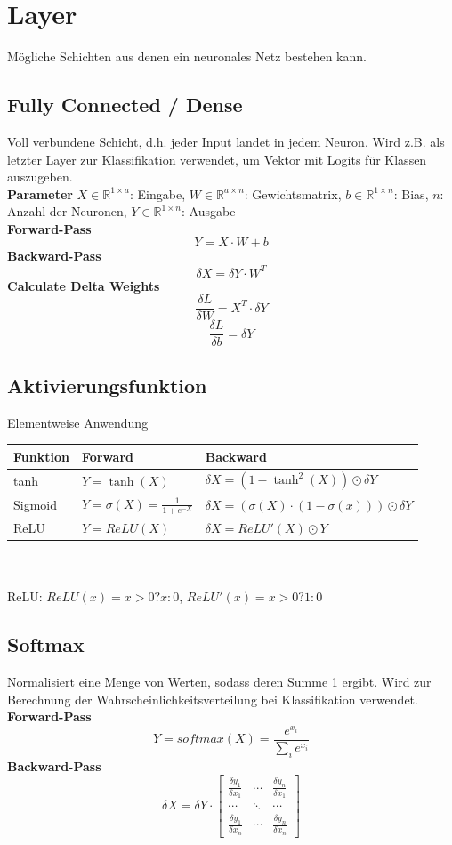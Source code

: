 \documentclass[12pt]{article}
\newcommand{\R}{\mathbb{R}}
\begin{document}
	\section{Layer}
	Mögliche Schichten aus denen ein neuronales Netz bestehen kann.
	\subsection{Fully Connected / Dense}
	Voll verbundene Schicht, d.h. jeder Input landet in jedem Neuron. Wird z.B. als letzter Layer zur Klassifikation verwendet, um Vektor mit Logits für Klassen auszugeben.\\
	\textbf{Parameter} $X \in \R^{1 \times a}$: Eingabe, $W \in \R^{a \times n}$: Gewichtsmatrix, $b \in \R^{1 \times n}$: Bias, $n$: Anzahl der Neuronen, $Y \in \R^{1 \times n}$: Ausgabe\\
	\textbf{Forward-Pass} $$Y = X \cdot W + b$$
	\textbf{Backward-Pass} $$\delta X = \delta Y \cdot W^T$$
	\textbf{Calculate Delta Weights} $$\frac{\delta L}{\delta W} = X^T \cdot \delta Y$$ $$\frac{\delta L}{\delta b} = \delta Y$$
	\subsection{Aktivierungsfunktion}
	Elementweise Anwendung\\
	\begin{tabular}{|l|l|l|}
	\hline
	\textbf{Funktion} & \textbf{Forward} & \textbf{Backward}\\
	\hline
	tanh & $Y = \tanh(X)$ & $\delta X = (1 - \tanh^2(X)) \odot \delta Y$\\
	\hline
	Sigmoid & $Y = \sigma(X) = \frac{1}{1 + e^{-X}}$ & $\delta X = (\sigma(X) \cdot (1-\sigma(x))) \odot \delta Y$\\
	\hline
	ReLU & $Y = ReLU(X)$ & $\delta X = ReLU'(X) \odot Y$\\
	\hline
	\end{tabular}\\
	\\
	ReLU: $ReLU(x) = x > 0 ? x : 0$, $ReLU'(x) = x > 0 ? 1 : 0$
	\subsection{Softmax}
	Normalisiert eine Menge von Werten, sodass deren Summe 1 ergibt. Wird zur Berechnung der Wahrscheinlichkeitsverteilung bei Klassifikation verwendet.\\
	\textbf{Forward-Pass} $$Y = softmax(X) = \frac{e^{x_i}}{\sum_i e^{x_i}}$$
	\textbf{Backward-Pass} $$\delta X = \delta Y \cdot
	\begin{bmatrix}
	\frac{\delta y_1}{\delta x_1} & \cdots & \frac{\delta y_n}{\delta x_1}\\
	\cdots & \ddots & \cdots\\
	\frac{\delta y_1}{\delta x_n} & \cdots & \frac{\delta y_n}{\delta x_n}
	\end{bmatrix}
	$$
\end{document}
